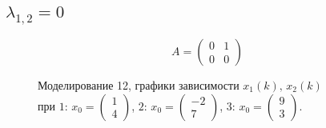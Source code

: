 \documentclass[a5paper, 10pt]{article}
\theoremstyle{definition}
\theoremstyle{plain}
\theoremstyle{remark}
\begin{document}
\subsection{$\lambda_{1, 2} = 0$}
\begin{equation}
A =
\begin{pmatrix}
 0 &  1  \\
0 & 0
\end{pmatrix}
\end{equation}
\begin{figure}[h!]
\caption{Моделирование 12, графики зависимости $x_1 \left( k \right), \, x_2 \left( k \right)$ \\ при  $1: \, x_0 = \begin{pmatrix} 1 \\ 4 \end{pmatrix}$, $2: \, x_0 = \begin{pmatrix} -2 \\ 7 \end{pmatrix}$, $3: \, x_0 = \begin{pmatrix} 9 \\ 3 \end{pmatrix}$.}
\end{figure}
\end{document}

